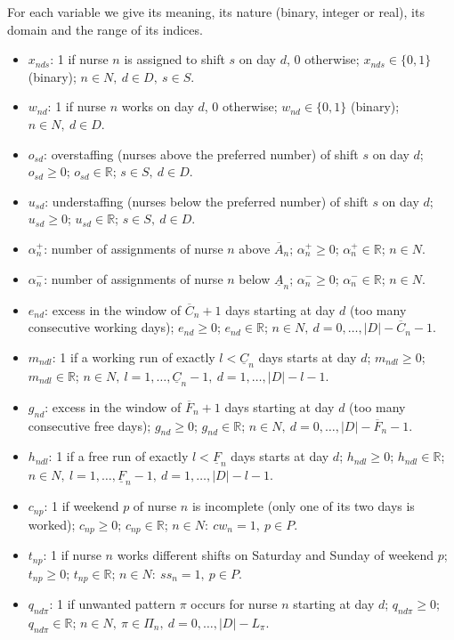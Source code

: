 \documentclass[11pt,a4paper]{article}
\newcommand{\Amin}{\underline{A}}   \newcommand{\Amax}{\overline{A}}
\newcommand{\Cmin}{\underline{C}}   \newcommand{\Cmax}{\overline{C}}
\newcommand{\Fmin}{\underline{F}}   \newcommand{\Fmax}{\overline{F}}
\begin{document}
For each variable we give its meaning, its nature (binary, integer or real), its domain and the range of its indices.

\begin{itemize}[leftmargin=1.4em,itemsep=0.45em]
  \item $x_{nds}$: 1 if nurse $n$ is assigned to shift $s$ on day $d$, 0 otherwise; $x_{nds}\in\{0,1\}$ (binary); $n\in N,\ d\in D,\ s\in S$.
  \item $w_{nd}$: 1 if nurse $n$ works on day $d$, 0 otherwise; $w_{nd}\in\{0,1\}$ (binary); $n\in N,\ d\in D$.
  \item $o_{sd}$: overstaffing (nurses above the preferred number) of shift $s$ on day $d$; $o_{sd}\ge 0$; $o_{sd}\in\mathbb{R}$; $s\in S,\ d\in D$.
  \item $u_{sd}$: understaffing (nurses below the preferred number) of shift $s$ on day $d$; $u_{sd}\ge 0$; $u_{sd}\in\mathbb{R}$; $s\in S,\ d\in D$.
  \item $\alpha^+_n$: number of assignments of nurse $n$ above $\Amax_n$; $\alpha^+_n\ge 0$; $\alpha^+_n\in\mathbb{R}$; $n\in N$.
  \item $\alpha^-_n$: number of assignments of nurse $n$ below $\Amin_n$; $\alpha^-_n\ge 0$; $\alpha^-_n\in\mathbb{R}$; $n\in N$.
  \item $e_{nd}$: excess in the window of $\Cmax_n+1$ days starting at day $d$ (too many consecutive working days); $e_{nd}\ge 0$; $e_{nd}\in\mathbb{R}$; $n\in N,\ d=0,\dots,|D|-\Cmax_n-1$.
  \item $m_{ndl}$: 1 if a working run of exactly $l<\Cmin_n$ days starts at day $d$; $m_{ndl}\ge 0$; $m_{ndl}\in\mathbb{R}$; $n\in N,\ l=1,\dots,\Cmin_n-1,\ d=1,\dots,|D|-l-1$.
  \item $g_{nd}$: excess in the window of $\Fmax_n+1$ days starting at day $d$ (too many consecutive free days); $g_{nd}\ge 0$; $g_{nd}\in\mathbb{R}$; $n\in N,\ d=0,\dots,|D|-\Fmax_n-1$.
  \item $h_{ndl}$: 1 if a free run of exactly $l<\Fmin_n$ days starts at day $d$; $h_{ndl}\ge 0$; $h_{ndl}\in\mathbb{R}$; $n\in N,\ l=1,\dots,\Fmin_n-1,\ d=1,\dots,|D|-l-1$.
  \item $c_{np}$: 1 if weekend $p$ of nurse $n$ is incomplete (only one of its two days is worked); $c_{np}\ge 0$; $c_{np}\in\mathbb{R}$; $n\in N:\ cw_n=1,\ p\in P$.
  \item $t_{np}$: 1 if nurse $n$ works different shifts on Saturday and Sunday of weekend $p$; $t_{np}\ge 0$; $t_{np}\in\mathbb{R}$; $n\in N:\ ss_n=1,\ p\in P$.
  \item $q_{nd\pi}$: 1 if unwanted pattern $\pi$ occurs for nurse $n$ starting at day $d$; $q_{nd\pi}\ge 0$; $q_{nd\pi}\in\mathbb{R}$; $n\in N,\ \pi\in\Pi_n,\ d=0,\dots,|D|-L_\pi$.
\end{itemize}
\end{document}

